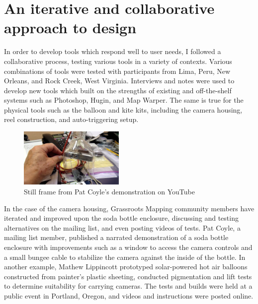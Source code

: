 \documentclass[11pt,oneside,notitlepage]{report}
\begin{document}
\section{An iterative and collaborative approach to design}

In order to develop tools which respond well to user needs, I followed a collaborative process, testing various tools in a variety of contexts. Various combinations of tools were tested with participants from Lima, Peru, New Orleans, and Rock Creek, West Virginia. Interviews and notes were used to develop new tools which built on the strengths of existing and off-the-shelf systems such as Photoshop, Hugin, and Map Warper. The same is true for the physical tools such as the balloon and kite kits, including the camera housing, reel construction, and auto-triggering setup. 

\begin{figure}
	\begin{flushright}
		\includegraphics[width=0.45\textwidth]{images/pat-coyle-video.png}
		\caption{Still frame from Pat Coyle's demonstration on YouTube \cite{coyle2010sodabottle}}
	\end{flushright}
\end{figure}

In the case of the camera housing, Grassroots Mapping community members have iterated and improved upon the soda bottle enclosure, discussing and testing alternatives on the mailing list, and even posting videos of tests. Pat Coyle, a mailing list member, published a narrated demonstration of a soda bottle enclosure with improvements such as a window to access the camera controls and a small bungee cable to stabilize the camera against the inside of the bottle. In another example, Mathew Lippincott prototyped solar-powered hot air balloons constructed from painter's plastic sheeting, conducted pigmentation and lift tests to determine suitability for carrying cameras. The tests and builds were held at a public event in Portland, Oregon, and videos and instructions were posted online.
\end{document}

